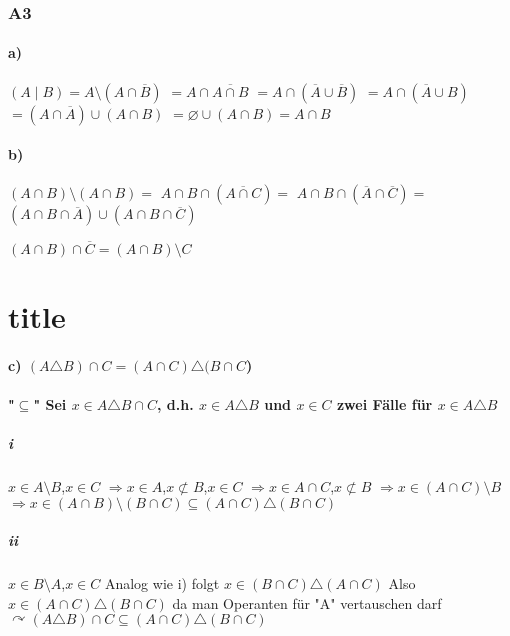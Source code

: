 \documentclass[11pt]{scrartcl}
\begin{document}
\section{A3}
\label{sec:A3}
\subsection{a)}
$(A \mid B)= A\setminus (A \cap \overline{B})$
$ = A\cap  \overline{A\cap B}$
$= A\cap (\overline{A} \cup \overline{B})$
$= A\cap (\overline{A} \cup B)$
$= (A \cap \overline{A}) \cup (A \cap B)$
$= \varnothing \cup (A \cap B)= A \cap B$

\subsection{b)}
$(A \cap B) \setminus (A \cap B)=$
$A \cap B \cap (\overline{A \cap C})=$
$A \cap B \cap (\overline{A} \cap \overline{C}) =$
$(A \cap B \cap \overline{A}) \cup (A \cap B \cap \overline{C})$
\begin{flushleft}
$(A \cap B) \cap \overline{C} = (A \cap B) \setminus C$
\end{flushleft}
\part{title}
\subsection{c) $(A \triangle B) \cap C = (A \cap C) \triangle (B \cap C$)}

\subsection*{"$\subseteq$"  Sei $x \in A \triangle B \cap C$, d.h. $x \in A \triangle B$ und $x \in C$ zwei Fälle für $x \in A \triangle B$}


\subsubsection{i}
$x \in A \setminus B$,$x \in C$
$\Rightarrow x \in A$,$x \not\subset B$,$x \in C$
$\Rightarrow x \in A \cap C$,$x \not\subset B$
$\Rightarrow x \in (A \cap C) \setminus B$
$\Rightarrow x \in (A \cap B) \setminus (B \cap C) \subseteq (A \cap C) \triangle (B \cap C)$


\subsubsection{ii}
$x \in B \setminus A$,$x \in C$ Analog wie i) folgt $x \in (B \cap C) \triangle (A \cap C)$ Also $x \in (A \cap C) \triangle (B \cap C)$ da man Operanten für "A" vertauschen darf
$\curvearrowright (A \triangle B) \cap C \subseteq (A \cap C) \triangle (B \cap C)$
\end{document}
